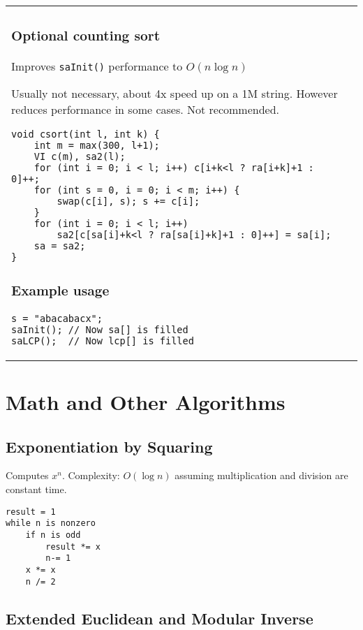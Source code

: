 \documentclass[letterpaper]{article}
\begin{document}
\begin{tabular}{@{}p{9cm}p{9cm}@{}}
\subsubsection{Optional counting sort}
Improves \texttt{saInit()} performance to $O\left(n\log n\right)$

Usually not necessary, about 4x speed up on a 1M string. However reduces performance in some cases. Not recommended.
\begin{lstlisting}
void csort(int l, int k) {
	int m = max(300, l+1);
	VI c(m), sa2(l);
	for (int i = 0; i < l; i++) c[i+k<l ? ra[i+k]+1 : 0]++;
	for (int s = 0, i = 0; i < m; i++) {
		swap(c[i], s); s += c[i];
	}
	for (int i = 0; i < l; i++)
		sa2[c[sa[i]+k<l ? ra[sa[i]+k]+1 : 0]++] = sa[i];
	sa = sa2;
}
\end{lstlisting}
\subsubsection{Example usage}

\begin{lstlisting}
s = "abacabacx";
saInit(); // Now sa[] is filled
saLCP();  // Now lcp[] is filled
\end{lstlisting}

\end{tabular}

\clearpage

\section{Math and Other Algorithms}

\subsection{Exponentiation by Squaring}

Computes $x^n$. Complexity: $O\left(\log n\right)$ assuming multiplication and division are constant time.

\begin{lstlisting}
result = 1
while n is nonzero
	if n is odd
		result *= x
		n-= 1
	x *= x
	n /= 2
\end{lstlisting}

\subsection{Extended Euclidean and Modular Inverse}
\end{document}
